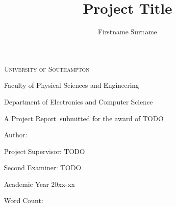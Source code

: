 \documentclass[a4paper]{article}
\author{Firstname Surname}
\title{Project Title}
\def \subtitle{Project Report}
\begin{document}


\makeatletter
\begin{titlepage}
    \centering
    {\scshape\huge University of Southampton \par}
    \vspace{0.3cm}
    {\LARGE Faculty of Physical Sciences and Engineering \par}
    \vspace{0.3cm}
    {\LARGE Department of Electronics and Computer Science \par}
    \vspace{4cm}
    {\huge\bfseries \@title \par}
    \vspace{4cm}
    {\LARGE A \subtitle \ submitted for the award of TODO \par}
    \vspace{3cm}
    {\centering\LARGE Author: \@author \par}
    \vspace{0.5cm}
    {\centering\Large Project Supervisor: TODO \par}
    {\centering\Large Second Examiner: TODO \par}
    \vspace{3cm}
    {\Large Academic Year 20xx-xx \par}
    \vspace{0.7cm}
    {Word Count: }
\end{titlepage}
\makeatother
\newpage


\newpage


\newpage

\tableofcontents
\newpage


\newpage


\newpage


\newpage


\newpage


\newpage

\newpage
{}


\newpage
\begin{appendices}
  \addappheadtotoc

  

\end{appendices}
\end{document}
